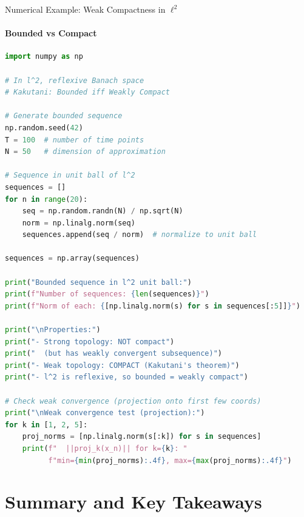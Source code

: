 \documentclass[aspectratio=169,10pt]{beamer}
\theoremstyle{definition}
\begin{document}
\begin{frame}[fragile]{Numerical Example: Weak Compactness in $\ell^2$}
\framesubtitle{Bounded vs Compact}

\begin{lstlisting}[language=Python]
import numpy as np

# In l^2, reflexive Banach space
# Kakutani: Bounded iff Weakly Compact

# Generate bounded sequence
np.random.seed(42)
T = 100  # number of time points
N = 50   # dimension of approximation

# Sequence in unit ball of l^2
sequences = []
for n in range(20):
    seq = np.random.randn(N) / np.sqrt(N)
    norm = np.linalg.norm(seq)
    sequences.append(seq / norm)  # normalize to unit ball

sequences = np.array(sequences)

print("Bounded sequence in l^2 unit ball:")
print(f"Number of sequences: {len(sequences)}")
print(f"Norm of each: {[np.linalg.norm(s) for s in sequences[:5]]}")

print("\nProperties:")
print("- Strong topology: NOT compact")
print("  (but has weakly convergent subsequence)")
print("- Weak topology: COMPACT (Kakutani's theorem)")
print("- l^2 is reflexive, so bounded = weakly compact")

# Check weak convergence (projection onto first few coords)
print("\nWeak convergence test (projection):")
for k in [1, 2, 5]:
    proj_norms = [np.linalg.norm(s[:k]) for s in sequences]
    print(f"  ||proj_k(x_n)|| for k={k}: "
          f"min={min(proj_norms):.4f}, max={max(proj_norms):.4f}")
\end{lstlisting}
\end{frame}

\section{Summary and Key Takeaways}
\end{document}
